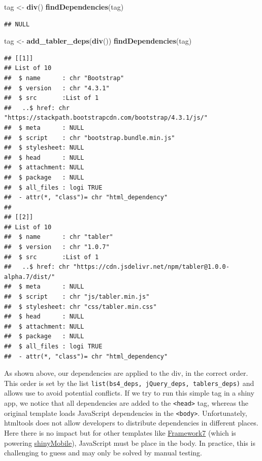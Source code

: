 \documentclass[
]{book}
\newenvironment{Shaded}{\begin{snugshade}}{\end{snugshade}}
\newcommand{\KeywordTok}[1]{\textcolor[rgb]{0.13,0.29,0.53}{\textbf{#1}}}
\newcommand{\NormalTok}[1]{#1}
\newcommand{\StringTok}[1]{\textcolor[rgb]{0.31,0.60,0.02}{#1}}
\begin{document}
\begin{Shaded}
\begin{Highlighting}[]
\NormalTok{tag <-}\StringTok{ }\KeywordTok{div}\NormalTok{()}
\KeywordTok{findDependencies}\NormalTok{(tag)}
\end{Highlighting}
\end{Shaded}

\begin{verbatim}
## NULL
\end{verbatim}

\begin{Shaded}
\begin{Highlighting}[]
\NormalTok{tag <-}\StringTok{ }\KeywordTok{add_tabler_deps}\NormalTok{(}\KeywordTok{div}\NormalTok{())}
\KeywordTok{findDependencies}\NormalTok{(tag)}
\end{Highlighting}
\end{Shaded}

\begin{verbatim}
## [[1]]
## List of 10
##  $ name      : chr "Bootstrap"
##  $ version   : chr "4.3.1"
##  $ src       :List of 1
##   ..$ href: chr "https://stackpath.bootstrapcdn.com/bootstrap/4.3.1/js/"
##  $ meta      : NULL
##  $ script    : chr "bootstrap.bundle.min.js"
##  $ stylesheet: NULL
##  $ head      : NULL
##  $ attachment: NULL
##  $ package   : NULL
##  $ all_files : logi TRUE
##  - attr(*, "class")= chr "html_dependency"
## 
## [[2]]
## List of 10
##  $ name      : chr "tabler"
##  $ version   : chr "1.0.7"
##  $ src       :List of 1
##   ..$ href: chr "https://cdn.jsdelivr.net/npm/tabler@1.0.0-alpha.7/dist/"
##  $ meta      : NULL
##  $ script    : chr "js/tabler.min.js"
##  $ stylesheet: chr "css/tabler.min.css"
##  $ head      : NULL
##  $ attachment: NULL
##  $ package   : NULL
##  $ all_files : logi TRUE
##  - attr(*, "class")= chr "html_dependency"
\end{verbatim}

As shown above, our dependencies are applied to the div, in the correct order. This order is set by the list \texttt{list(bs4\_deps,\ jQuery\_deps,\ tablers\_deps)} and allows use to avoid potential conflicts. If we try to run this simple tag in a shiny app, we notice that all dependencies are added to the \texttt{\textless{}head\textgreater{}} tag, whereas the original template loads JavaScript dependencies in the \texttt{\textless{}body\textgreater{}}. Unfortunately, htmltools does not allow developers to distribute dependencies in different places. Here there is no impact but for other templates like \href{https://framework7.io}{Framework7} (which is powering \href{https://github.com/RinteRface/shinyMobile}{shinyMobile}), JavaScript must be place in the body. In practice, this is challenging to guess and may only be solved by manual testing.
\end{document}
